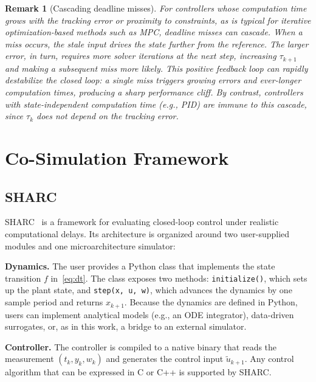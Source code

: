\documentclass[conference]{IEEEtran}
\newtheorem{remark}{Remark}
\begin{document}
\begin{remark}[Cascading deadline misses]\label{rem:cascade}
  For controllers whose computation time grows with the tracking
  error or proximity to constraints, as is typical for iterative optimization-based methods
  such as MPC, deadline misses can cascade.  When a miss occurs,
  the stale input drives the state further from the reference.
  The larger error, in turn, requires more solver iterations at
  the next step, increasing $\tau_{k+1}$ and making a subsequent
  miss more likely.  This positive feedback loop can rapidly
  destabilize the closed loop: a single miss triggers growing
  errors and ever-longer computation times, producing a sharp
  \emph{performance cliff}.  By contrast, controllers with
  state-independent computation time (e.g., PID) are immune to
  this cascade, since $\tau_k$ does not depend on the tracking
  error.
\end{remark}

\section{Co-Simulation Framework}\label{sec:framework}

\subsection{SHARC}\label{sec:sharc}

SHARC~\cite{wintz2025sharc} is a framework for evaluating
closed-loop control under realistic computational delays.
Its architecture is organized around two user-supplied modules
and one microarchitecture simulator:

\noindent\textbf{Dynamics.}
The user provides a Python class that implements the state
transition $f$ in~\eqref{eq:dt}.  The class exposes two
methods: \texttt{initialize()}, which sets up the plant state,
and \texttt{step(x, u, w)}, which advances the dynamics by
one sample period and returns $x_{k+1}$.  Because the dynamics
are defined in Python, users can implement analytical models
(e.g., an ODE integrator), data-driven surrogates, or, as in
this work, a bridge to an external simulator.

\noindent\textbf{Controller.}
The controller is compiled to a native binary that reads
the measurement $(t_k, y_k, w_k)$ and
generates the control input $\tilde{u}_{k+1}$.
Any control algorithm that can be expressed in C or C++ is
supported by SHARC.
\end{document}
